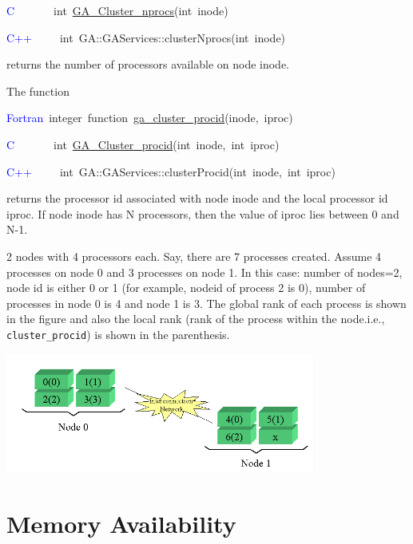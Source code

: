 \textcolor{blue}{C}~~~~~~~int~\href{https://hpc.pnl.gov/globalarrays/api/c_op_api.html\#ga_cluster_nprocs}{GA\_{}Cluster\_{}nprocs}(int~inode)~

\textcolor{blue}{C++~~~~}~int~GA::GAServices::clusterNprocs(int~inode)

returns the number of processors available on node inode.

The function

\textcolor{blue}{Fortran}~integer~function~\href{https://hpc.pnl.gov/globalarrays/api/f_op_api.html\#ga_cluster_procid}{ga\_{}cluster\_{}procid}(inode,~iproc)~

\textcolor{blue}{C}~~~~~~~int~\href{https://hpc.pnl.gov/globalarrays/api/c_op_api.html\#ga_cluster_procid}{GA\_{}Cluster\_{}procid}(int~inode,~int~iproc)~

\textcolor{blue}{C++}~~~~~int~GA::GAServices::clusterProcid(int~inode,~int~iproc)

returns the processor id associated with node inode and the local
processor id iproc. If node inode has N processors, then the value
of iproc lies between 0 and N-1.

\textit{} 2 nodes with 4 processors each. Say,
there are 7 processes created. Assume 4 processes on node 0 and 3
processes on node 1. In this case: number of nodes=2, node id is either
0 or 1 (for example, nodeid of process 2 is 0), number of processes
in node 0 is 4 and node 1 is 3. The global rank of each process is
shown in the figure and also the local rank (rank of the process within
the node.i.e., \texttt{cluster\_procid}) is shown in the parenthesis.

\begin{flushleft}
\includegraphics[width=4in]{cluster}
\par\end{flushleft}


\section{Memory Availability }


